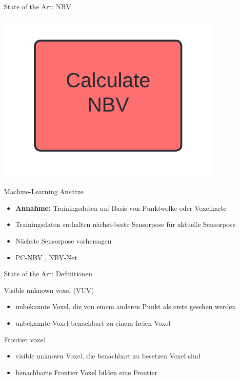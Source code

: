 \documentclass{beamer}
\begin{document}
\begin{frame}{State of the Art: NBV}
	\vspace{-1cm}
	\hfill
	\begin{minipage}{0.2\textwidth}
		\includegraphics[width=\textwidth]{Graphics/nbv_flow.png}
	\end{minipage}
	\vspace{-0.5cm}
	\begin{block}{Machine-Learning Ansätze}
		\begin{itemize}
			\item \textbf{Annahme:} Trainingsdaten auf Basis von Punktwolke oder Voxelkarte
			\item Trainingsdaten enthalten nächst-beste Sensorpose für aktuelle Sensorpose
			\item Nächste Sensorpose vorhersagen
			\item PC-NBV \cite{zeng_pc-nbv_2020}, NBV-Net \cite{mendoza_supervised_2020}

		\end{itemize}
	\end{block}
\end{frame}

\begin{frame}{State of the Art: Definitionen}
	\begin{exampleblock}{Visible unknown voxel (VUV)}
		\begin{itemize}
			\item unbekannte Voxel, die von einem anderen Punkt als erste gesehen werden
			\item unbekannte Voxel benachbart zu einem freien Voxel
		\end{itemize}
		\cite{vasquez-gomez_vpl_2020}
	\end{exampleblock}
	\begin{exampleblock}{Frontier voxel}
		\begin{itemize}
			\item visible unknown Voxel, die benachbart zu besetzen Voxel sind
			\item benachbarte Frontier Voxel bilden eine Frontier

		\end{itemize}
		\cite{vasquez-gomez_vpl_2020}
	\end{exampleblock}
\end{frame}
\end{document}
